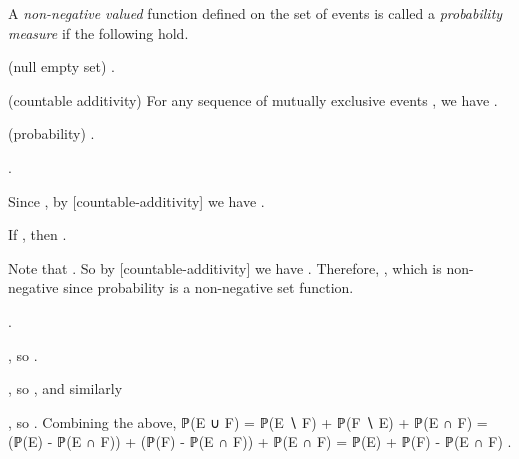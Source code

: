 	



\stopchapter


\startchapter [title={Axiomatic probability theory}]

	\startdefinition [title={Probability axioms}]
		A \emph{non-negative valued} function  defined on the set of events is called a \emph{probability measure} if the following hold.
			\item  (null empty set)  .
			\item[countable-additivity]  (countable additivity)  For any sequence of mutually exclusive events , we have .
			\item  (probability)  .
		\stopitemize
	\stopdefinition

	

	\startproposition
		.
	\stopproposition

	\startproof
		Since , by [countable-additivity] we have .
	\stopproof


	\startproposition
		If , then .
	\stopproposition

	\startproof
		Note that . So by [countable-additivity] we have . Therefore, , which is non-negative since probability is a non-negative set function.
	\stopproof


	\startproposition [title={Inclusion-Exclusion}]
		.
	\stopproposition

	\startproof
			\item  {}, so .
			\item  {}, so , and similarly
			\item  {}, so .
		\stopitemize
		Combining the above,
		\startformula  \startalign[n=2]
			\NC  ℙ(E ∪ F)  \NC =  ℙ(E ∖ F) + ℙ(F ∖ E) + ℙ(E ∩ F)  \NR
			\NC  \NC =  (ℙ(E) - ℙ(E ∩ F)) + (ℙ(F) - ℙ(E ∩ F)) + ℙ(E ∩ F)  \NR
			\NC  \NC =  ℙ(E) + ℙ(F) - ℙ(E ∩ F) .
		\stopalign  \stopformula
	\stopproof

\stopchapter

